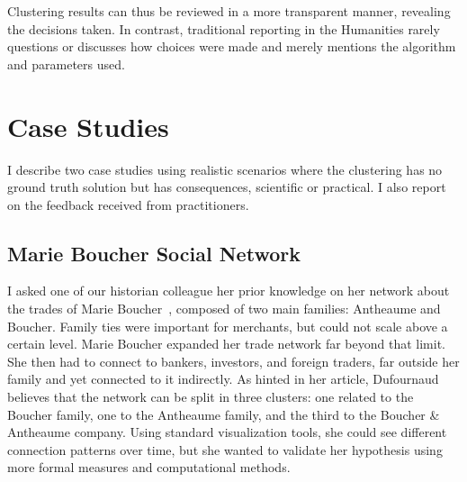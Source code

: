 Clustering results can thus be reviewed in a more transparent manner, revealing the decisions taken. In contrast, traditional reporting in the Humanities rarely questions or discusses how choices were made and merely mentions the algorithm and parameters used.


\section{Case Studies}

I describe two case studies using realistic scenarios where the clustering has no ground truth solution but has consequences, scientific or practical. I also report on the feedback received from practitioners.

\subsection{Marie Boucher Social Network}
\label{sud:MB}

I asked one of our historian colleague her prior knowledge on her network about the trades of Marie Boucher~\cite{Dufournaud17},  %
composed of two main families: Antheaume and Boucher. Family ties were important for merchants, but could not scale above a certain level. Marie Boucher expanded her trade network far beyond that limit. She then had to connect to bankers, investors, and foreign traders, far outside her family and yet connected to it indirectly. %
As hinted in her article, Dufournaud believes that the network can be split in three clusters: one related to the Boucher family, one to the Antheaume family, and the third to the Boucher \& Antheaume company. Using standard visualization tools, she could see different connection patterns over time, but she wanted to validate her hypothesis using more formal measures and computational methods.




